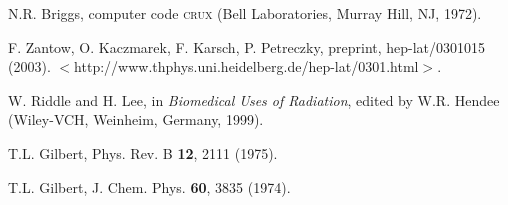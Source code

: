 \documentclass[]{interact}
\theoremstyle{plain}%
\theoremstyle{definition}
\theoremstyle{remark}
\begin{document}
\begin{thebibliography}{99}
N.R. Briggs, computer code \textsc{crux} (Bell Laboratories, Murray Hill, NJ,
  1972).

F. Zantow, O. Kaczmarek, F. Karsch, P. Petreczky, preprint, hep-lat/0301015
  (2003). $<$http://www.thphys.uni.heidelberg.de/hep-lat/0301.html$>$.

W. Riddle and H. Lee, in \emph{Biomedical Uses of Radiation}, edited by W.R.
  Hendee (Wiley-VCH, Weinheim, Germany, 1999).

T.L. Gilbert, Phys. Rev. B \textbf{12}, 2111 (1975).

T.L. Gilbert, J. Chem. Phys. \textbf{60}, 3835 (1974).

\end{thebibliography}
\end{document}
